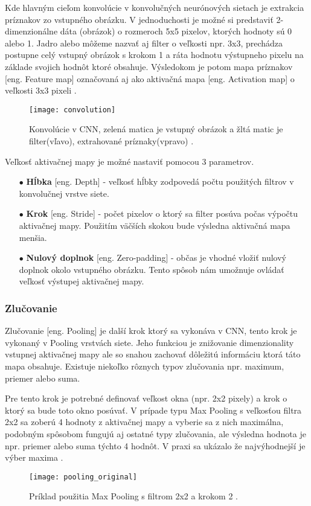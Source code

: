 Kde hlavným cieľom konvolúcie v konvolučných neurónových sietach je extrakcia príznakov zo vstupného obrázku.
V jednoduchosti je možné si predstaviť 2-dimenzionálne dáta (obrázok) o rozmeroch 5x5 pixelov, ktorých hodnoty sú 0 alebo 1.
Jadro alebo môžeme nazvať aj filter o veľkosti npr. 3x3, prechádza postupne celý vstupný obrázok s krokom 1 a ráta hodnotu výstupneho pixelu na základe svojich hodnôt ktoré obsahuje.
Výsledokom je potom mapa príznakov [eng. Feature map] označovaná aj ako aktivačná mapa [eng. Activation map] o veľkosti 3x3 pixeli \cite{odkaz:CNNArticle}.
\begin{figure}[H]
    \centering
    \texttt{[image: convolution]}
    \caption{Konvolúcie v CNN, zelená matica je vstupný obrázok a žltá matic je filter(vľavo), extrahované príznaky(vpravo) \cite{odkaz:CNNArticle}.}
    \label{pic:Convolution}
\end{figure}

Veľkosť aktivačnej mapy je možné nastaviť pomocou 3 parametrov.
\begin{enumerate}
    \item[$\bullet$] \textbf{Hĺbka} [eng. Depth] - veľkosť hĺbky zodpovedá počtu použitých filtrov v konvolučnej vrstve siete.
    \item[$\bullet$] \textbf{Krok} [eng. Stride] - počet pixelov o ktorý sa filter posúva počas výpočtu aktivačnej mapy.
    Použitím väčších skokou bude výsledna aktivačná mapa menšia.
    \item[$\bullet$] \textbf{Nulový doplnok} [eng. Zero-padding] - občas je vhodné vložiť nulový doplnok okolo vstupného obrázku.
    Tento spôsob nám umožnuje ovládať veľkosť výstupej aktivačnej mapy.
\end{enumerate}


\subsubsection{Zlučovanie}
Zlučovanie [eng. Pooling] je další krok ktorý sa vykonáva v CNN, tento krok je vykonaný v Pooling vrstvách siete.
Jeho funkciou je znižovanie dimenzionality vstupnej aktivačnej mapy ale so snahou zachovať dôležitú informáciu ktorá táto mapa obsahuje.
Existuje niekoľko rôznych typov zlučovania npr. maximum, priemer alebo suma.

Pre tento krok je potrebné definovať veľkost okna (npr. 2x2 pixely) a krok o ktorý sa bude toto okno posúvať.
V prípade typu Max Pooling s veľkosťou filtra 2x2 sa zoberú 4 hodnoty z aktivačnej mapy a vyberie sa z nich maximálna, podobným spôsobom
    fungujú aj ostatné typy zlučovania, ale výsledna hodnota je npr. priemer alebo suma týchto 4 hodnôt.
V praxi sa ukázalo že najvýhodnejší je výber maxima \cite{odkaz:CNNArticle}.
\begin{figure}[H]
    \centering
    \texttt{[image: pooling\_original]}
    \caption{Príklad použitia Max Pooling s filtrom 2x2 a krokom 2 \cite{odkaz:CNNArticle}.}
    \label{pic:Convolution}
\end{figure}


